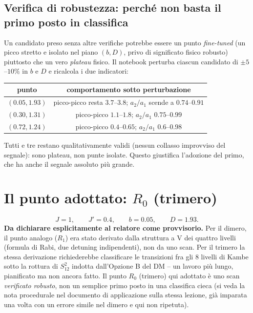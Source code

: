 \documentclass[11pt,a4paper]{article}
\begin{document}
\subsection{Verifica di robustezza: perché non basta il primo posto in classifica}

Un candidato preso senza altre verifiche potrebbe essere un punto
\emph{fine-tuned} (un picco stretto e isolato nel piano $(b,D)$,
privo di significato fisico robusto) piuttosto che un vero
\emph{plateau} fisico. Il notebook perturba ciascun candidato di
$\pm5$--$10\%$ in $b$ e $D$ e ricalcola i due indicatori:

\begin{center}
\begin{tabular}{@{}cc@{}}
\toprule
punto & comportamento sotto perturbazione \\
\midrule
$(0.05,1.93)$ & picco-picco resta $3.7$--$3.8$; $a_2/a_1$ scende a $0.74$--$0.91$ \\
$(0.30,1.31)$ & picco-picco $1.1$--$1.8$; $a_2/a_1$ $0.75$--$0.99$ \\
$(0.72,1.24)$ & picco-picco $0.4$--$0.65$; $a_2/a_1$ $0.6$--$0.98$ \\
\bottomrule
\end{tabular}
\end{center}
Tutti e tre restano qualitativamente validi (nessun collasso improvviso
del segnale): sono plateau, non punte isolate. Questo giustifica
l'adozione del primo, che ha anche il segnale assoluto più grande.

\section{Il punto adottato: $R_0$ (trimero)}

$$J=1, \qquad J'=0.4, \qquad b=0.05, \qquad D=1.93.$$
\textbf{Da dichiarare esplicitamente al relatore come provvisorio.} Per
il dimero, il punto analogo ($R_1$) era stato derivato dalla struttura a
V dei quattro livelli (formula di Rabi, due detuning indipendenti), non
da uno scan. Per il trimero la stessa derivazione richiederebbe
classificare le transizioni fra gli 8 livelli di Kambe sotto la rottura
di $S_{12}^2$ indotta dall'Opzione B del DM -- un lavoro più lungo,
pianificato ma non ancora fatto. Il punto $R_0$ (trimero) qui adottato è
uno scan \emph{verificato robusto}, non un semplice primo posto in una
classifica cieca (si veda la nota procedurale nel documento di
applicazione sulla stessa lezione, già imparata una volta con un errore
simile nel dimero e qui non ripetuta).
\end{document}
